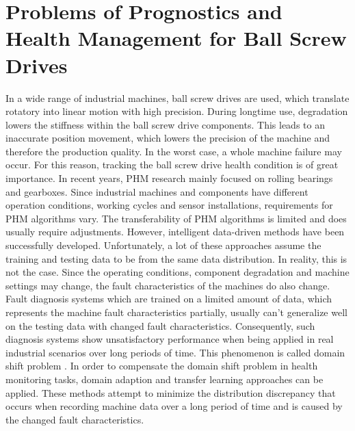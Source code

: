 \section{Problems of Prognostics and Health Management for Ball Screw Drives}
In a wide range of industrial machines, ball screw drives are used, which translate rotatory into linear motion with high precision. During longtime use, degradation lowers the stiffness within the ball screw drive components. This leads to an inaccurate position movement, which lowers the precision of the machine and therefore the production quality. In the worst case, a whole machine failure may occur. For this reason, tracking the ball screw drive health condition is of great importance. In recent years, PHM research mainly focused on rolling bearings and gearboxes. Since industrial machines and components have different operation conditions, working cycles and sensor installations, requirements for PHM algorithms vary. The transferability of PHM algorithms is limited and does usually require adjustments. However, intelligent data-driven methods have been successfully developed. Unfortunately, a lot of these approaches assume the training and testing data to be from the same data distribution. In reality, this is not the case. Since the operating conditions, component degradation and machine settings may change, the fault characteristics of the machines do also change. Fault diagnosis systems which are trained on a limited amount of data, which represents the machine fault characteristics partially, usually can't generalize well on the testing data with changed fault characteristics. Consequently, such diagnosis systems show unsatisfactory performance when being applied in real industrial scenarios over long periods of time. This phenomenon is called domain shift problem \cite{AZAMFAR2020103932}. In order to compensate the domain shift problem in health monitoring tasks, domain adaption and transfer learning approaches can be applied. These methods attempt to minimize the distribution discrepancy that occurs when recording machine data over a long period of time and is caused by the changed fault characteristics. 

